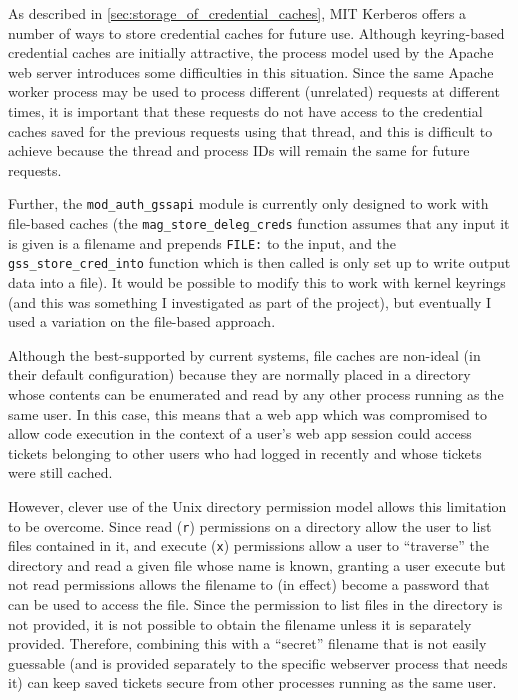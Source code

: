 \documentclass[12pt]{report}
\begin{document}
As described in \autoref{sec:storage_of_credential_caches}, MIT Kerberos offers a number of ways to store credential caches for future use. Although keyring-based credential caches are initially attractive, the process model used by the Apache web server introduces some difficulties in this situation. Since the same Apache worker process may be used to process different (unrelated) requests at different times, it is important that these requests do not have access to the credential caches saved for the previous requests using that thread, and this is difficult to achieve because the thread and process IDs will remain the same for future requests.

Further, the \verb+mod_auth_gssapi+ module is currently only designed to work with file-based caches (the \verb+mag_store_deleg_creds+ function assumes that any input it is given is a filename and prepends \texttt{FILE:} to the input, and the \verb+gss_store_cred_into+ function which is then called is only set up to write output data into a file). It would be possible to modify this to work with kernel keyrings (and this was something I investigated as part of the project), but eventually I used a variation on the file-based approach.

Although the best-supported by current systems, file caches are non-ideal (in their default configuration) because they are normally placed in a directory whose contents can be enumerated and read by any other process running as the same user. In this case, this means that a web app which was compromised to allow code execution in the context of a user's web app session could access tickets belonging to other users who had logged in recently and whose tickets were still cached.

However, clever use of the Unix directory permission model allows this limitation to be overcome. Since read (\texttt{r}) permissions on a directory allow the user to list files contained in it, and execute (\texttt{x}) permissions allow a user to ``traverse'' the directory and read a given file whose name is known, granting a user execute but not read permissions allows the filename to (in effect) become a password that can be used to access the file. Since the permission to list files in the directory is not provided, it is not possible to obtain the filename unless it is separately provided. Therefore, combining this with a ``secret'' filename that is not easily guessable (and is provided separately to the specific webserver process that needs it) can keep saved tickets secure from other processes running as the same user.
\end{document}
